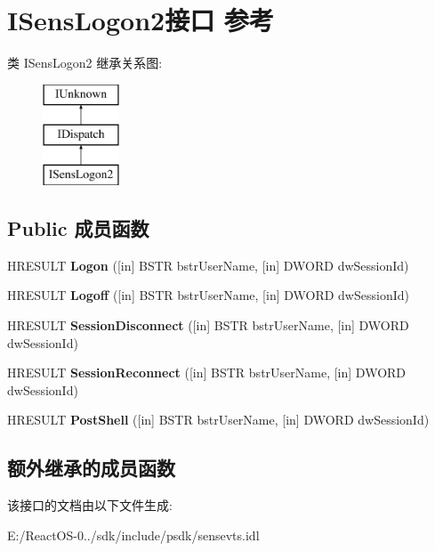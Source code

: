 \hypertarget{interface_i_sens_logon2}{}\section{I\+Sens\+Logon2接口 参考}
\label{interface_i_sens_logon2}
类 I\+Sens\+Logon2 继承关系图\+:\begin{figure}[H]
\begin{center}
\leavevmode
\includegraphics[height=3.000000cm]{interface_i_sens_logon2}
\end{center}
\end{figure}
\subsection*{Public 成员函数}
\begin{DoxyCompactItemize}
\item 
\mbox{\label{interface_i_sens_logon2_a363474a0aa16f55935a6a1c531463ec5}} 
H\+R\+E\+S\+U\+LT {\bfseries Logon} (\mbox{[}in\mbox{]} B\+S\+TR bstr\+User\+Name, \mbox{[}in\mbox{]} D\+W\+O\+RD dw\+Session\+Id)
\item 
\mbox{\label{interface_i_sens_logon2_a82de0750d70e67eae3680da2dbe42d61}} 
H\+R\+E\+S\+U\+LT {\bfseries Logoff} (\mbox{[}in\mbox{]} B\+S\+TR bstr\+User\+Name, \mbox{[}in\mbox{]} D\+W\+O\+RD dw\+Session\+Id)
\item 
\mbox{\label{interface_i_sens_logon2_a5ed1543972ad283b93b87e4eec46c5e8}} 
H\+R\+E\+S\+U\+LT {\bfseries Session\+Disconnect} (\mbox{[}in\mbox{]} B\+S\+TR bstr\+User\+Name, \mbox{[}in\mbox{]} D\+W\+O\+RD dw\+Session\+Id)
\item 
\mbox{\label{interface_i_sens_logon2_a22da96c9dd4e2cf37bf965df6de58377}} 
H\+R\+E\+S\+U\+LT {\bfseries Session\+Reconnect} (\mbox{[}in\mbox{]} B\+S\+TR bstr\+User\+Name, \mbox{[}in\mbox{]} D\+W\+O\+RD dw\+Session\+Id)
\item 
\mbox{\label{interface_i_sens_logon2_a554eff866d6fbb2988c1a6a8683e1a5a}} 
H\+R\+E\+S\+U\+LT {\bfseries Post\+Shell} (\mbox{[}in\mbox{]} B\+S\+TR bstr\+User\+Name, \mbox{[}in\mbox{]} D\+W\+O\+RD dw\+Session\+Id)
\end{DoxyCompactItemize}
\subsection*{额外继承的成员函数}


该接口的文档由以下文件生成\+:\begin{DoxyCompactItemize}
\item 
E\+:/\+React\+O\+S-\/0../sdk/include/psdk/sensevts.\+idl\end{DoxyCompactItemize}
